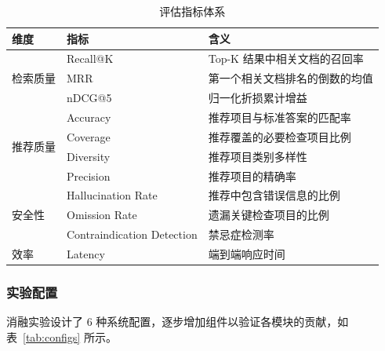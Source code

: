\documentclass[12pt,a4paper]{article}
\begin{document}
\begin{table}[H]
    \centering
    \caption{评估指标体系}
    \label{tab:metrics}
    \begin{tabular}{lll}
        \toprule
        \textbf{维度} & \textbf{指标} & \textbf{含义} \\
        \midrule
        \multirow{3}{*}{检索质量} & Recall@K & Top-K 结果中相关文档的召回率 \\
        & MRR & 第一个相关文档排名的倒数的均值 \\
        & nDCG@5 & 归一化折损累计增益 \\
        \midrule
        \multirow{4}{*}{推荐质量} & Accuracy & 推荐项目与标准答案的匹配率 \\
        & Coverage & 推荐覆盖的必要检查项目比例 \\
        & Diversity & 推荐项目类别多样性 \\
        & Precision & 推荐项目的精确率 \\
        \midrule
        \multirow{3}{*}{安全性} & Hallucination Rate & 推荐中包含错误信息的比例 \\
        & Omission Rate & 遗漏关键检查项目的比例 \\
        & Contraindication Detection & 禁忌症检测率 \\
        \midrule
        效率 & Latency & 端到端响应时间 \\
        \bottomrule
    \end{tabular}
\end{table}

\subsubsection{实验配置}

消融实验设计了 6 种系统配置，逐步增加组件以验证各模块的贡献，如表~\ref{tab:configs} 所示。

\begin{table}[H]
    \centering
    \caption{消融实验配置}
    \label{tab:configs}
\end{table}
\end{document}
